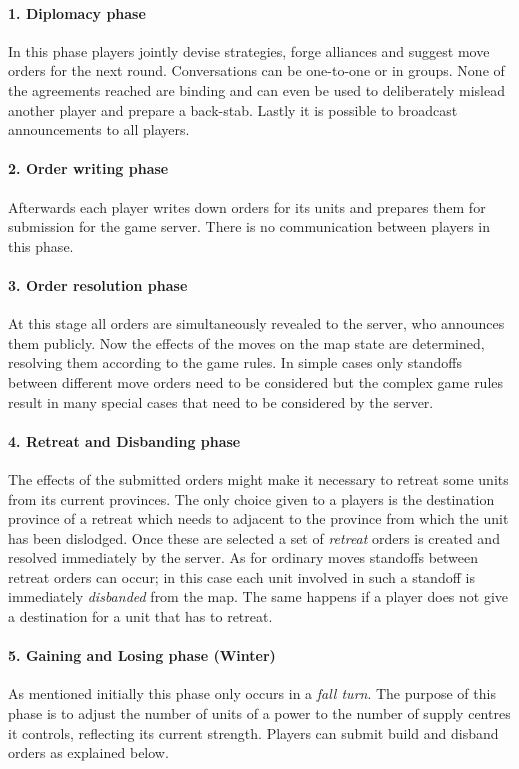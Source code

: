\documentclass[pdftex,11pt,a4paper]{report}
\begin{document}
\paragraph{1. Diplomacy phase}
In this phase players jointly devise strategies, forge alliances and
suggest move orders for the next round. Conversations can be 
one-to-one or in groups. None of the agreements
reached are binding and can even be used to deliberately 
mislead another player and prepare a back-stab. Lastly it is possible
to broadcast announcements to all players.

\paragraph{2. Order writing phase}
Afterwards each player writes down orders for its units and prepares
them for submission for the game server. There is no communication 
between players in this phase. 

\paragraph{3. Order resolution phase}
At this stage all orders are simultaneously revealed to the server,
who announces them publicly. Now the effects of the moves on the
map state are determined, resolving them according to the game rules.
In simple cases only standoffs between different move orders need
to be considered but the complex game rules result in many special
cases that need to be considered by the server. 

\paragraph{4. Retreat and Disbanding phase}
The effects of the submitted orders might make it necessary to retreat
some units from its current provinces. The only choice given to a
players is the destination province of a retreat which needs to
adjacent to the province from which the unit has been dislodged. Once
these are selected a set of \textit{retreat} orders is created and
resolved immediately by the server. As for ordinary moves standoffs
between retreat orders can occur; in this case each unit involved in
such a standoff is immediately \textit{disbanded} from the map. The
same happens if a player does not give a destination for a unit that
has to retreat.

\paragraph{5. Gaining and Losing phase (Winter)}
As mentioned initially this phase only occurs in a \textit{fall turn}.
The purpose of this phase is to adjust the number of units of a power
to the number of supply centres it controls, reflecting its current
strength. Players can submit build and disband orders as explained
below. 
\end{document}

